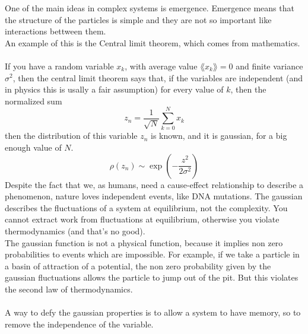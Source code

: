 One of the main ideas in complex systems is emergence. Emergence means that the structure of the particles is simple and they are not so important like interactions bettween them. \\
An example of this is the Central limit theorem, which comes from mathematics. \\ \\
If you have a random variable $x_k$, with average value $\lang x_k \rang = 0$ and finite variance $\sigma^2$, then the central limit theorem says that, if the variables are independent (and in physics this is usally a fair assumption) for every value of $k$, then the normalized sum 
$$
	z_n = \frac{1}{\sqrt{N}}\sum_{k=0}^N x_k
$$
then the distribution of this variable $z_n$ is known, and it is gaussian, for a big enough value of $N$.
$$
	\rho(z_n) \sim \exp\left(-\frac{z^2}{2\sigma^2}\right)
$$
Despite the fact that we, as humans, need a cause-effect relationship to describe a phenomenon, nature loves independent events, like DNA mutations.
The gaussian describes the fluctuations of a system at equilibrium, not the complexity. You cannot extract work from fluctuations at equilibrium, otherwise you violate thermodynamics (and that's no good). \\
The gaussian function is not a physical function, because it implies non zero probabilities to events which are impossible. For example, if we take a particle in a basin of attraction of a potential, the non zero probability given by the gaussian fluctuations allows the particle to jump out of the pit. But this violates the second law of thermodynamics. \\ \\
A way to defy the gaussian properties is to allow a system to have memory, so to remove the independence of the variable. 
\begin{center}
\end{center}
